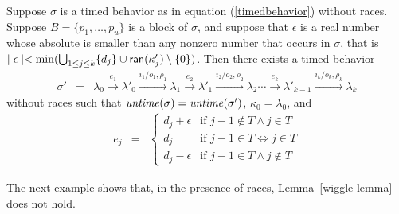 \begin{lemma}
\label{wiggle lemma}
Suppose $\sigma$ is a timed behavior as in equation (\ref{timedbehavior}) without races.
Suppose $B = \{ p_1 ,\ldots, p_u \}$ is a block of $\sigma$, and suppose
that $\epsilon$ is a real number whose absolute is smaller than any nonzero number that occurs in $\sigma$, that is
$\mid \epsilon \mid  < \min (\bigcup_{1 \leq j \leq k} \{ d_j \} \cup {\textsf{ran}}(\kappa'_j) \setminus \{ 0 \} )$.
Then there exists a timed behavior
\begin{eqnarray*}
\sigma' & = & \lambda_0 \xrightarrow{e_1} \lambda'_0 \xrightarrow{i_1/o_1, \rho_1} \lambda_1 \xrightarrow{e_2} \lambda'_1 \xrightarrow{i_2/o_2, \rho_2} \lambda_2 \cdots
\xrightarrow{e_k} \lambda'_{k-1} \xrightarrow{i_k/o_k, \rho_k} \lambda_{k}
\end{eqnarray*}
without races such that
$\mathit{untime}(\sigma)=\mathit{untime}(\sigma')$,
$\kappa_0 = \lambda_0$, and
\begin{eqnarray*}
e_j & = & \left\{ \begin{array}{ll}
d_j + \epsilon & \mbox{if } j-1 \not\in T \wedge j \in T \\
d_j & \mbox{if } j-1 \in T \Leftrightarrow j \in T\\
d_j - \epsilon & \mbox{if } j-1 \in T \wedge j \not\in T
\end{array}\right.
\end{eqnarray*}
\end{lemma}
The next example shows that, in the presence of races, Lemma~\ref{wiggle lemma} does not hold. 

